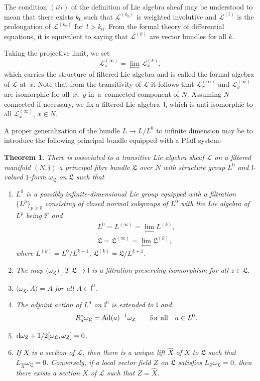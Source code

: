 \documentclass[10pt,a4paper]{amsart}
\newcommand{\cL}{\mathcal L}
\newcommand{\fL}{\mathfrak L}
\newcommand{\f}{\mathfrak f}
\newcommand{\lf}{\mathfrak l}
\newcommand{\om}{\omega}
\newtheorem{thm}{Theorem}[section]
\numberwithin{equation}{section}
\begin{document}
The condition $(iii)$ of the definition of Lie algebra sheaf may be understood to mean that there exists $k_0$ such that $\cL^{(k_0)}$ is weighted involutive and $\cL^{(l)}$ is the prolongation of
$\cL^{(k_0)}$ for~$l>k_0$. From the formal theory of differential equations, it is equivalent
to saying that $\cL^{(k)}$ are vector bundles for all $k$.

Taking the projective limit, we set
\[
\cL^{(\infty)}_x = \lim_{\longleftarrow} \cL^{(k)}_x,
\]
which carries the structure of filtered Lie algebra and is called the formal algebra of $\cL$ at~$x$. Note that from the transitivity of $\cL$ it follows that $\cL^{(\infty)}_x$ and $\cL^{(\infty)}_y$ are isomorphic for all~$x$,~$y$ in~a~connected component of $N$. Assuming $N$ connected if necessary, we fix a filtered Lie algebra~$\lf$, which is anti-isomorphic to all $\cL^{(\infty)}_x$, $x\in N$.

A proper generalization of the bundle $L\to L/L^0$ to infinite dimension may be to introduce the following principal bundle equipped with a Pfaff system:


\begin{thm}\label{thm:n3}
There is associated to a transitive Lie algebra sheaf $\cL$ on a filtered manifold $(N,\f)$ a principal fibre bundle $\fL$ over $N$ with structure group $L^0$ and $\lf$-valued $1$-form $\om_{\fL}$ on $\fL$ such that
	\begin{enumerate}\itemsep=0pt
		\item[$(i)$] $L^0$ is a possibly infinite-dimensional Lie group equipped with a filtration $\{L^p\}_{p\ge 0}$ consisting of closed normal subgroups of $L^0$ with the Lie algebra of $L^p$ being $\lf^p$ and
		\begin{gather*}
		L^0 = L^{(\infty)} = \lim_{\longleftarrow} L^{(k)},\\
		\fL = \fL^{(\infty)} = \lim_{\longleftarrow} \fL^{(k)},
		\end{gather*}
		where $L^{(k)} = L^0/L^{k+1}$, $\fL^{(k)} = \fL/L^{k+1}$.
		\item[$(ii)$] The map $\big(\om_{\fL}\big)_z\colon T_z\fL\to\lf$ is a filtration preserving isomorphism for all $z\in \fL$.
		\item[$(iii)$] $\langle \om_{\fL}, \tilde A\rangle = A$ for all $A\in \lf^0$.
		\item[$(iv)$] The adjoint action of $L^0$ on $\lf^0$ is extended to $\lf$ and
		\[
		R^*_a\om_{\fL} = {\rm Ad}(a)^{-1}\om_{\fL} \qquad\text{for all}\quad a\in L^0.
		\]
		\item[$(v)$] ${\rm d}\om_{\fL} + 1/2 [\om_{\fL},\om_{\fL}] = 0$.
		\item[$(vi)$] If $X$ is a section of $\cL$, then there is a unique lift $\widehat X$ of $X$ to $\fL$ such that $L_{\widehat X}\om_{\fL} = 0$. Conversely, if a local vector field $Z$ on $\fL$ satisfies $L_Z\om_{\fL} = 0$, then there exists a section $X$ of $\cL$ such that $Z= \widehat X$.
	\end{enumerate}
\end{thm}
\end{document}
